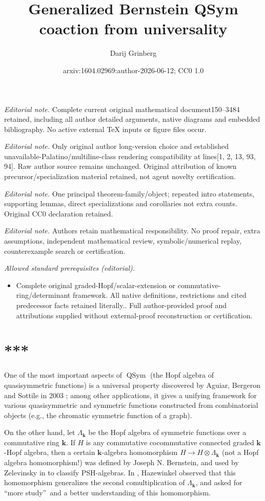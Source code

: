 \documentclass[numbers=enddot,12pt,final,onecolumn,notitlepage,abstracton]{scrartcl}%
\title{Generalized Bernstein QSym coaction from universality}
\author{Darij Grinberg}
\date{arxiv:1604.02969:author-2026-06-12; CC0 1.0}
\theoremstyle{definition}
\begin{document}
\maketitle
\noindent\textit{Editorial note.} Complete current original mathematical document150--3484 retained, including all author detailed arguments, native diagrams and embedded bibliography. No active external TeX inputs or figure files occur.\par\medskip
\noindent\textit{Editorial note.} Only original author long-version choice and established unavailable-Palatino/multiline-class rendering compatibility at lines[1, 2, 13, 93, 94]. Raw author source remains unchanged. Original attribution of known precursor/specialization material retained, not agent novelty certification.\par\medskip
\noindent\textit{Editorial note.} One principal theorem-family/object; repeated intro statements, supporting lemmas, direct specializations and corollaries not extra counts. Original CC0 declaration retained.\par\medskip
\noindent\textit{Editorial note.} Authors retain mathematical responsibility. No proof repair, extra assumptions, independent mathematical review, symbolic/numerical replay, counterexample search or certification.\par\medskip
\noindent\textit{Allowed standard prerequisites (editorial).}\begin{itemize}
\item Complete original graded-Hopf/scalar-extension or commutative-ring/determinant framework. All native definitions, restrictions and cited predecessor facts retained literally.. Full author-provided proof and attributions supplied without external-proof reconstruction or certification.
\end{itemize}\medskip
\section*{***}

One of the most important aspects of $\operatorname*{QSym}$ (the Hopf algebra
of quasisymmetric functions) is a universal property discovered by Aguiar,
Bergeron and Sottile in 2003 \cite{ABS}; among other applications, it gives a
unifying framework for various quasisymmetric and symmetric functions
constructed from combinatorial objects (e.g., the chromatic symmetric function
of a graph).

On the other hand, let $\Lambda_{\mathbf{k}}$ be the Hopf algebra of symmetric
functions over a commutative ring $\mathbf{k}$. If $H$ is any commutative
cocommutative connected graded $\mathbf{k}$-Hopf algebra, then a certain
$\mathbf{k}$-algebra homomorphism $H\rightarrow H\otimes\Lambda_{\mathbf{k}}$
(not a Hopf algebra homomorphism!) was defined by Joseph N. Bernstein, and
used by Zelevinsky in \cite[\S 5.2]{Zelevi81} to classify PSH-algebras. In
\cite[\S 18.24]{HazeWitt}, Hazewinkel observed that this homomorphism
generalizes the second comultiplication of $\Lambda_{\mathbf{k}}$, and asked
for \textquotedblleft more study\textquotedblright\ and a better understanding
of this homomorphism.
\end{document}

